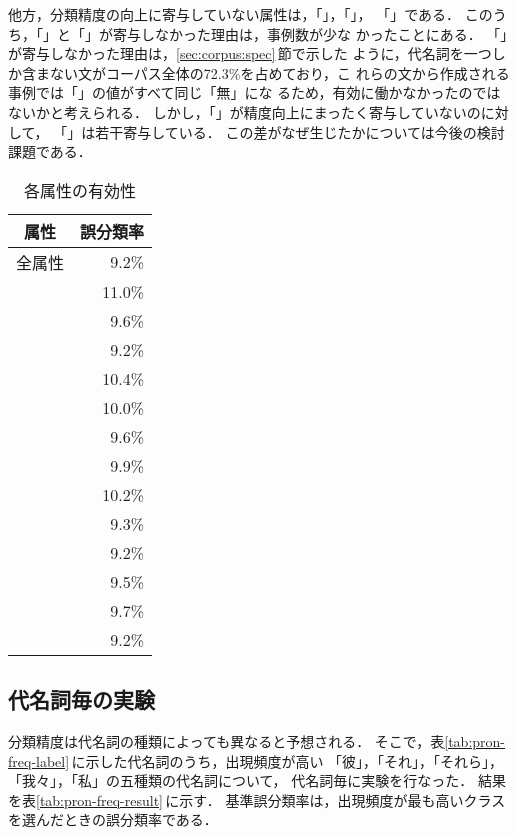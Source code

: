 他方，分類精度の向上に寄与していない属性は，「\COORD」，「\INDEFPRON」，
「\SAMEPRONB」である．
このうち，「\COORD」と「\INDEFPRON」が寄与しなかった理由は，事例数が少な
かったことにある．
「\SAMEPRONB」が寄与しなかった理由は，\ref{sec:corpus:spec}\,節で示した
ように，代名詞を一つしか含まない文がコーパス全体の72.3\%を占めており，こ
れらの文から作成される事例では「\SAMEPRONB」の値がすべて同じ「無」にな
るため，有効に働かなかったのではないかと考えられる．
しかし，「\SAMEPRONB」が精度向上にまったく寄与していないのに対して，
「\SAMEPRONF」は若干寄与している．
この差がなぜ生じたかについては今後の検討課題である．
\begin{table}[htbp]
\caption{各属性の有効性}
\label{tab:feats-effect}
\begin{center}
\begin{tabular}{|l||r|}\hline
\multicolumn{1}{|c||}{属性} & \multicolumn{1}{c|}{誤分類率}\\\hline\hline
全属性		&  9.2\% \\
\PRON		& 11.0\% \\
\FZKG		&  9.6\% \\
\COORD		&  9.2\% \\
\GVNRSEM	& 10.4\% \\
\GVNRFZKG	& 10.0\% \\
\CLSTYPE	&  9.6\% \\
\CLSENDB	&  9.9\% \\
\CLSENDF	& 10.2\% \\
\ANAPH		&  9.3\% \\
\SAMEPRONB	&  9.2\% \\
\SAMEPRONF	&  9.5\% \\
\CONJ		&  9.7\% \\
\INDEFPRON	&  9.2\% \\\hline
\end{tabular}
\end{center}
\end{table}

\subsection{代名詞毎の実験}

分類精度は代名詞の種類によっても異なると予想される．
そこで，表\ref{tab:pron-freq-label}\,に示した代名詞のうち，出現頻度が高い
「彼」，「それ」，「それら」，「我々」，「私」の五種類の代名詞について，
代名詞毎に実験を行なった．
結果を表\ref{tab:pron-freq-result}\,に示す．
基準誤分類率は，出現頻度が最も高いクラスを選んだときの誤分類率である．

